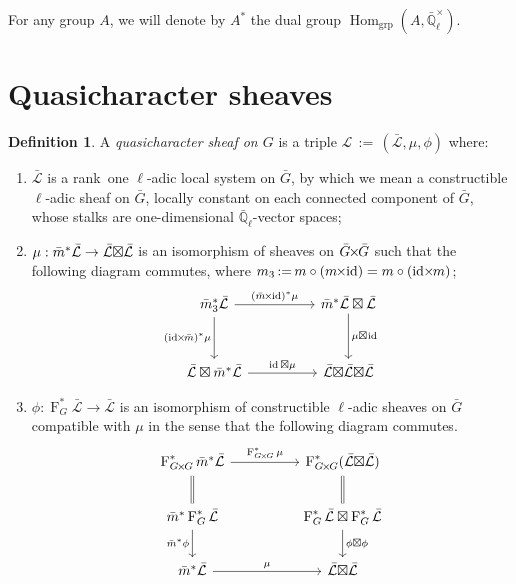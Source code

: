 \documentclass[11pt]{amsart}
\makeatletter
\theoremstyle{plain}
\theoremstyle{definition}
\newtheorem{definition}[theorem]{Definition}
\theoremstyle{remark}
\newcommand{\EE}{\mathbb{\bar Q}_\ell}
\newcommand{\EEx}{\EE^\times}
\newcommand{\Frob}[1]{\operatorname{F}_{#1}}
\DeclareMathOperator{\Hom}{Hom}
\DeclareMathOperator{\id}{id}
\newcommand{\ceq}{{\, :=\, }}
\newcommand{\qcs}[1]{{\mathcal{#1}}}
\newcommand{\gqcs}[1]{{\mathcal{\bar #1}}}
\newcommand{\labitem}[2]{%
\def\@itemlabel{\textbf{#1}}
\item
\def\@currentlabel{#1}\label{#2}}
\newcommand{\bm}{\bar{m}}
\newcommand{\bG}{\bar{G}}
\newcommand{\tight}[3]{\hspace{-#1pt}{#2}\hspace{-#3pt}}
\newcommand{\bGxG}{\text{$\bar{G} \tight{1}{\times}{1} \bar{G}$}}
\newcommand{\GxxG}{\text{$G \tight{1}{\times}{1} G$}}
\newcommand{\LxL}{\text{$\gqcs{L} \tight{0}{\boxtimes}{0} \gqcs{L}$}}
\makeatother
\begin{document}
For any group $A$, we will denote by $A^*$ the dual group $\Hom_\text{grp}(A, \EEx)$.

\section{Quasicharacter sheaves}\label{sec:category}

\begin{definition}\label{def:QC}
A \emph{quasicharacter sheaf on $G$} is a triple
$\qcs{L}\ceq (\gqcs{L},\mu,\phi)$ where:
\begin{enumerate}
\labitem{(QC.1)}{QC.1} $\gqcs{L}$ is a rank~one $\ell$-adic local system on $\bG$, by which we mean
a constructible $\ell$-adic sheaf on $\bG$, locally constant on each connected component of $\bG$, whose stalks are one-dimensional $\EE$-vector spaces; 
\labitem{(QC.2)}{QC.2} $\mu: \bm^* \gqcs{L} \to \LxL$ is an isomorphism of sheaves on $\bGxG$ such that the following diagram commutes, 
  where $m_3 \ceq m\circ (m\tight{1}{\times}{2}\id) = m\circ (\id\tight{2}{\times}{1} m)$;
%
  \[
  \begin{tikzcd}[row sep=30]
  \bm_3^*\gqcs{L} \arrow{rr}{(\bm \tight{1}{\times}{2} \id)^*\mu} \arrow[swap]{d}{(\id \tight{2}{\times}{1} \bm)^*\mu}
    &&  \bm^*\gqcs{L} \boxtimes \gqcs{L} \dar{\mu \tight{0}{\boxtimes}{1} \id} \\
    \gqcs{L} \boxtimes \bm^* \gqcs{L} \arrow{rr}{\id \boxtimes \mu}
    &&  \gqcs{L} \tight{0}{\boxtimes}{0} \LxL
  \end{tikzcd}
  \]
%
\labitem{(QC.3)}{QC.3} $\phi : \Frob{G}^* \gqcs{L} \to \gqcs{L}$ is an
  isomorphism of constructible $\ell$-adic sheaves on $\bG$ compatible with $\mu$ in the sense that the following diagram commutes.
%
  \[
  \begin{tikzcd}[row sep=20]
  \Frob{\GxxG}^* \bm^* \gqcs{L} \arrow{rr}{\Frob{\GxxG}^*\mu}
    && \Frob{\GxxG}^*(\LxL)\\
    \arrow[equal]{u} \bm^*  \Frob{G}^* \gqcs{L} \arrow[swap]{d}{\bm^* \phi}
    && \Frob{G}^*\gqcs{L}\boxtimes \Frob{G}^*\gqcs{L} \dar{\phi\boxtimes \phi} \arrow[equal]{u} \\
    \bm^*\gqcs{L} \arrow{rr}{\mu}
    && \LxL
  \end{tikzcd}
  \]
\end{enumerate}
\end{definition}
\end{document}

